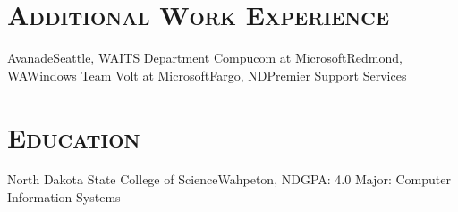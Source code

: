 \documentclass[11pt,letter,roman]{moderncv}
\begin{document}
\section{\textsc{Additional Work Experience}}
{Avanade}{Seattle, WA}{ITS Department}{}
{Compucom at Microsoft}{Redmond, WA}{Windows Team}{}
{Volt at Microsoft}{Fargo, ND}{Premier Support Services}{}

\section{\textsc{Education}}
{North Dakota State College of Science}{Wahpeton, ND}{GPA: 4.0}
{Major: Computer Information Systems}
\end{document}
